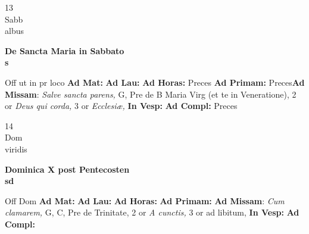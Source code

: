 \documentclass[10pt, openany]{book}
\begin{document}
    \begin{center}
        \begin{minipage}{3.5in}
            \vspace{2em}
            \begin{minipage}{0.5in}
                {\Huge 13} \\
                {\normalsize Sabb} \\
                {\normalsize albus}
            \end{minipage}
            \begin{minipage}{3.0in}
                \textbf{ \large De Sancta Maria in Sabbato \\
                \textnormal{\normalsize s}} \\ 
            \end{minipage}
            \begin{justify}Off ut in pr loco
                \textbf{Ad Mat: }
                \textbf{Ad Lau: }
                \textbf{Ad Horas: }Preces
                \textbf{Ad Primam: }Preces\textbf{Ad Missam}: \textit{Salve sancta parens,} G, Pre de B Maria Virg (et te in Veneratione), 2 or \textit{Deus qui corda,} 3 or \textit{Ecclesiæ,}  
                \textbf{In Vesp: }
                \textbf{Ad Compl: }Preces
            \end{justify}
        \end{minipage}
    \end{center}

    \begin{center}
        \begin{minipage}{3.5in}
            \vspace{2em}
            \begin{minipage}{0.5in}
                {\Huge 14} \\
                {\normalsize Dom} \\
                {\normalsize viridis}
            \end{minipage}
            \begin{minipage}{3.0in}
                \textbf{ \large Dominica X post Pentecosten \\
                \textnormal{\normalsize sd}} \\ 
            \end{minipage}
            \begin{justify}Off Dom
                \textbf{Ad Mat: }
                \textbf{Ad Lau: }
                \textbf{Ad Horas: }
                \textbf{Ad Primam: }\textbf{Ad Missam}: \textit{Cum clamarem,} G, C, Pre de Trinitate, 2 or \textit{A cunctis,} 3 or ad libitum,  
                \textbf{In Vesp: }
                \textbf{Ad Compl: }
            \end{justify}
        \end{minipage}
    \end{center}
\end{document}
